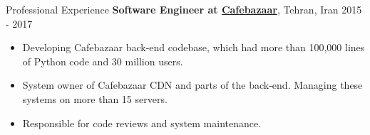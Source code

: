 \documentclass{resume} %
\begin{document}
\begin{rSection}{Professional Experience}
	{\bf Software Engineer at \href{https://cafebazaar.ir/}{Cafebazaar}}, Tehran, Iran \hfill 2015 - 2017
	\smallskip
	\vspace{-0.5em}
	\begin{itemize}[leftmargin=3mm]
		\setlength{\itemsep}{1pt}
		\setlength{\parskip}{0pt}
		\setlength{\parsep}{0pt}
		\renewcommand\labelitemi{$\cdot$}

		\item Developing Cafebazaar back-end codebase, which had more than 100,000 lines of Python code and 30 million users.
		\item System owner of Cafebazaar CDN and parts of the back-end. Managing these systems on more than 15 servers.
		\item Responsible for code reviews and system maintenance.
	\end{itemize}
	
\end{rSection}

\end{document}
